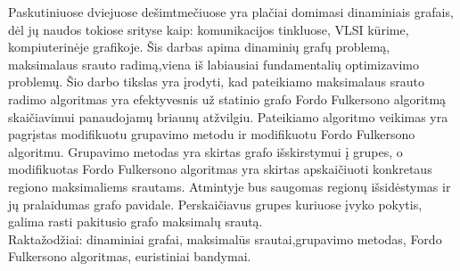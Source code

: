 Paskutiniuose dviejuose dešimtmečiuose yra plačiai domimasi dinaminiais grafais, dėl jų naudos tokiose srityse kaip: komunikacijos tinkluose, VLSI kūrime, kompiuterinėje grafikoje. Šis darbas apima dinaminių grafų problemą, maksimalaus srauto radimą,viena iš labiausiai fundamentalių optimizavimo problemų. Šio darbo tikslas yra įrodyti, kad pateikiamo maksimalaus srauto radimo algoritmas yra efektyvesnis už statinio grafo Fordo Fulkersono algoritmą skaičiavimui panaudojamų briaunų atžvilgiu. Pateikiamo algoritmo veikimas yra pagrįstas modifikuotu grupavimo metodu ir modifikuotu Fordo Fulkersono algoritmu. Grupavimo metodas yra skirtas grafo išskirstymui į grupes, o modifikuotas Fordo Fulkersono algoritmas yra skirtas apskaičiuoti konkretaus regiono maksimaliems srautams. Atmintyje bus saugomas regionų išsidėstymas ir jų pralaidumas grafo pavidale. Perskaičiavus grupes kuriuose įvyko pokytis, galima rasti pakitusio grafo maksimalų srautą. \\
Raktažodžiai: dinaminiai grafai, maksimalūs srautai,grupavimo metodas, Fordo Fulkersono algoritmas, euristiniai bandymai.